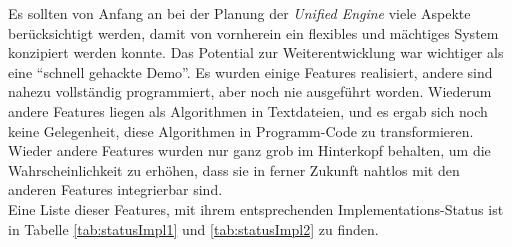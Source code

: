 	Es sollten von Anfang an bei der Planung der \emph{Unified Engine} viele Aspekte berücksichtigt werden,
	damit von vornherein ein flexibles und mächtiges System konzipiert werden konnte.
	Das Potential zur Weiterentwicklung war wichtiger als eine "`schnell gehackte Demo"'.
	Es wurden einige Features realisiert, andere sind nahezu vollständig programmiert, aber noch nie ausgeführt worden.
	Wiederum andere Features liegen als Algorithmen in Textdateien, und 
	es ergab sich noch keine Gelegenheit, diese Algorithmen in Programm-Code zu transformieren.
	Wieder andere Features wurden nur ganz grob im Hinterkopf behalten, um die Wahrscheinlichkeit zu erhöhen, 
	dass sie in ferner Zukunft nahtlos mit den anderen Features integrierbar sind.\\
	Eine Liste dieser Features, mit ihrem entsprechenden Implementations-Status ist in 
	Tabelle \ref{tab:statusImpl1} und \ref{tab:statusImpl2} zu finden.\\
										  


